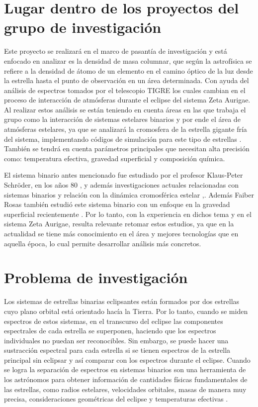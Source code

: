 \documentclass[11pt]{article}
\begin{document}
\section{Lugar dentro de los proyectos del grupo de investigación}
\noindent Este proyecto se realizará en el marco de pasantía de investigación y está enfocado en analizar es la densidad de masa columnar, que según la astrofísica se refiere a la densidad de átomo de un elemento en el camino óptico de la luz desde la estrella hasta el punto de observación en un área determinada. Con ayuda del análisis de espectros tomados por el telescopio TIGRE los cuales cambian en el proceso de interacción de atmósferas durante el eclipse del sistema Zeta Aurigae. Al realizar estos análisis se están teniendo en cuenta áreas en las que trabaja el grupo como la interacción de sistemas estelares binarios y por ende el área de atmósferas estelares, ya que se analizará la cromosfera de la estrella gigante fría del sistema, implementando códigos de simulación para este tipo de estrellas \cite{mittag2013ii}. También se tendrá en cuenta parámetros principales que necesitan alta precisión como: temperatura efectiva, gravedad superficial y composición química.


El sistema binario antes mencionado fue estudiado por el profesor Klaus-Peter Schröder, en los años 80 \cite{kps9}, y además investigaciones actuales relacionadas con sistemas binarios \cite{fisher2005local} y relación con la dinámica cromosférica estelar \cite{schroder2012basal},\cite{mittag2016chromospheric}. Además Faiber Rosas también estudió este sistema binario con un enfoque en la gravedad superficial recientemente \cite{Dani}. Por lo tanto, con la experiencia en dichos tema y en el sistema Zeta Aurigae, resulta relevante retomar estos estudios, ya que en la actualidad se tiene más conocimiento en el área y mejores tecnologías que en aquella época, lo cual permite desarrollar análisis más concretos.

\section{Problema de investigación}

\noindent Los sistemas de estrellas binarias eclipsantes están formados por dos estrellas cuyo plano orbital está orientado hacía la Tierra. Por lo tanto, cuando se miden espectros de estos sistemas, en el transcurso del eclipse las componentes espectrales de cada estrella se superponen, haciendo que los espectros individuales no puedan ser reconocibles. Sin embargo, se puede hacer una sustracción espectral para cada estrella si se tienen espectros de la estrella principal sin eclipsar y así comparar con los espectros durante el eclipse. Cuando se logra la separación de espectros en sistemas binarios son una herramienta de los astrónomos para obtener información de cantidades físicas fundamentales de las estrellas, como radios estelares, velocidades orbitales, masas de manera muy precisa, consideraciones geométricas del eclipse y temperaturas efectivas \cite{schroder2009stars}.
\end{document}
